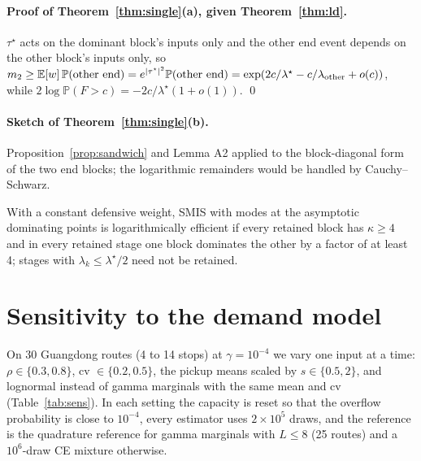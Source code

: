 \documentclass[ijoc,sglanonrev]{informs4}
\newcommand{\E}{\mathbb{E}}
\renewcommand{\P}{\mathbb{P}}
\begin{document}
\begin{APPENDICES}
\paragraph{Proof of Theorem~\ref{thm:single}(a), given Theorem~\ref{thm:ld}.}
$\tau^\star$ acts on the dominant block's inputs only and the other end event
depends on the other block's inputs only, so $m_2\ge\E[w]\,\P(\text{other end})=
e^{|\tau^\star|^2}\P(\text{other end}) = \exp(2c/\lambda^\star - c/\lambda_{\rm other}+o(c))$,
while $2\log\P(F>c) = -2c/\lambda^\star(1+o(1))$. \qed

\paragraph{Sketch of Theorem~\ref{thm:single}(b).} Proposition~\ref{prop:sandwich}
and Lemma A2 applied to the block-diagonal form of the two end blocks; the
logarithmic remainders would be handled by Cauchy--Schwarz.

\begin{theorem}[sketch]\label{thm:mixture}
With a constant defensive weight, SMIS with modes at the asymptotic
dominating points is logarithmically efficient if every retained block has
$\kappa\ge4$ and in every retained stage one block dominates the other by a
factor of at least 4; stages with $\lambda_k\le\lambda^\star/2$ need not be
retained.
\end{theorem}

\section{Sensitivity to the demand model}
\label{sec:sensitivity}
On 30 Guangdong routes (4 to 14 stops) at $\gamma=10^{-4}$ we vary one
input at a time: $\rho\in\{0.3,0.8\}$, cv $\in\{0.2,0.5\}$, the pickup means
scaled by $s\in\{0.5,2\}$, and lognormal instead of gamma marginals with the
same mean and cv (Table~\ref{tab:sens}). In each setting the capacity is reset
so that the overflow probability is close to $10^{-4}$, every estimator uses
$2\times10^5$ draws, and the reference is the quadrature reference for gamma
marginals with $L\le8$ (25 routes) and a $10^6$-draw CE mixture otherwise.


\end{APPENDICES}
\end{document}

